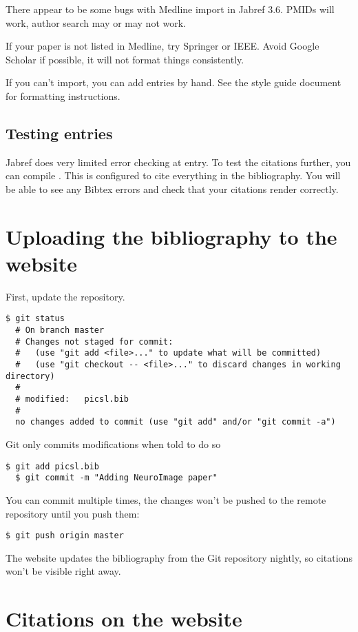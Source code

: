 \documentclass{InsightArticle}
\begin{document}
There appear to be some bugs with Medline import in Jabref 3.6. PMIDs will work, author search may or may not work. 

If your paper is not listed in Medline, try Springer or IEEE. Avoid Google Scholar if possible, it will not format things consistently. 

If you can't import, you can add entries by hand. See the style guide document for formatting instructions.


\subsection{Testing entries}

Jabref does very limited error checking at entry. To test the citations further, you can compile . This is configured to cite everything in the bibliography. You will be able to see any Bibtex errors and check that your citations render correctly.


\section{Uploading the bibliography to the website}

First, update the repository.

\begin{lstlisting}[style=bash]
  $ git status
  # On branch master
  # Changes not staged for commit:
  #   (use "git add <file>..." to update what will be committed)
  #   (use "git checkout -- <file>..." to discard changes in working directory)
  #
  #	modified:   picsl.bib
  #
  no changes added to commit (use "git add" and/or "git commit -a")
\end{lstlisting}

Git only commits modifications when told to do so
\begin{lstlisting}[style=bash]
  $ git add picsl.bib
  $ git commit -m "Adding NeuroImage paper" 
\end{lstlisting}

You can commit multiple times, the changes won't be pushed to the remote repository until you push them:
\begin{lstlisting}[style=bash]
  $ git push origin master 
\end{lstlisting}

The website updates the bibliography from the Git repository nightly, so citations won't be visible right away.


\section{Citations on the website}
\end{document}
